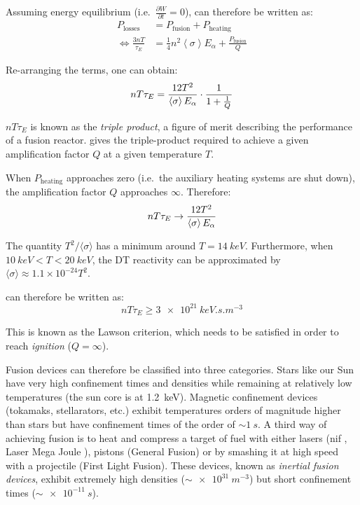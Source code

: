 Assuming energy equilibrium (i.e.\ $\frac{\partial W}{\partial t} = 0$),  can therefore be written as:
\begin{align}
    P_\mathrm{losses} &= P_\mathrm{fusion} + P_\mathrm{heating} \\
    \Leftrightarrow \frac{3 n T}{\tau_E} &= \frac{1}{4} n^2 \left\langle \sigma \right\rangle E_\alpha + \frac{P_\mathrm{fusion}}{Q}
\end{align}

Re-arranging the terms, one can obtain:
\begin{equation}
    n T \tau_E = \frac{12 T^2}{\left\langle \sigma \right\rangle E_\alpha} \cdot \frac{1}{1 + \frac{1}{Q}}
    \labeq{triple product}
\end{equation}

$n T \tau_E$ is known as the \textit{triple product}, a figure of merit describing the performance of a fusion reactor.
 gives the triple-product required to achieve a given amplification factor $Q$ at a given temperature $T$.

When $P_\mathrm{heating}$ approaches zero (i.e.\ the auxiliary heating systems are shut down), the amplification factor $Q$ approaches $\infty$.
Therefore:
\begin{equation}
    n T \tau_E \rightarrow \frac{12 T^2}{\left\langle \sigma \right\rangle E_\alpha}
    \labeq{triple product infinity}
\end{equation}

The quantity $T^2/\langle \sigma \rangle$ has a minimum around $T=\SI{14}{keV}$.
Furthermore, when $\SI{10}{keV} < T < \SI{20}{keV}$, the DT reactivity can be approximated by $\langle \sigma \rangle \approx 1.1 \times 10^{-24} T^2$.

 can therefore be written as:
\begin{equation}
    n T \tau_E \geq \SI{3e21}{keV.s.m^{-3}}
\end{equation}

This is known as the Lawson criterion, which needs to be satisfied in order to reach \textit{ignition} ($Q = \infty$).


Fusion devices can therefore be classified into three categories.
Stars like our Sun have very high confinement times and densities while remaining at relatively low temperatures (the sun core is at \SI{1.2}{keV}).
Magnetic confinement devices (\glspl{tokamak}, \glspl{stellarator}, etc.) exhibit temperatures orders of magnitude higher than stars but have confinement times of the order of $\sim \SI{1}{s}$.
A third way of achieving fusion is to heat and compress a target of fuel with either lasers (\acrshort{nif} , Laser Mega Joule ), pistons (General Fusion) or by smashing it at high speed with a projectile (First Light Fusion).
These devices, known as \textit{inertial fusion devices}, exhibit extremely high densities ($\sim \SI{e31}{m^{-3}}$) but short confinement times ($\sim \SI{e-11}{s}$).
 
